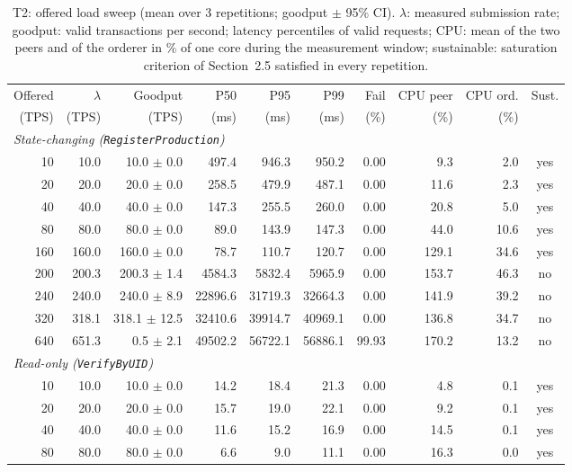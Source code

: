 \begin{table}[H]
\centering\small
\caption{T2: offered load sweep (mean over 3 repetitions; goodput $\pm$ 95\% CI). $\lambda$: measured
submission rate; goodput: valid transactions per second; latency percentiles of valid requests; CPU: mean of the two
peers and of the orderer in \% of one core during the measurement window; sustainable: saturation criterion of
Section~2.5 satisfied in every repetition.}
\label{tab:t2}
\setlength{\tabcolsep}{3.5pt}
\begin{tabular}{rrrrrrrrrc}
\toprule
Offered & $\lambda$ & Goodput & P50 & P95 & P99 & Fail & CPU peer & CPU ord. & Sust. \\
(TPS) & (TPS) & (TPS) & (ms) & (ms) & (ms) & (\%) & (\%) & (\%) & \\
\midrule
\multicolumn{10}{l}{\emph{State-changing (\texttt{RegisterProduction})}} \\
10 & 10.0 & 10.0 $\pm$ 0.0 & 497.4 & 946.3 & 950.2 & 0.00 & 9.3 & 2.0 & yes \\
20 & 20.0 & 20.0 $\pm$ 0.0 & 258.5 & 479.9 & 487.1 & 0.00 & 11.6 & 2.3 & yes \\
40 & 40.0 & 40.0 $\pm$ 0.0 & 147.3 & 255.5 & 260.0 & 0.00 & 20.8 & 5.0 & yes \\
80 & 80.0 & 80.0 $\pm$ 0.0 & 89.0 & 143.9 & 147.3 & 0.00 & 44.0 & 10.6 & yes \\
160 & 160.0 & 160.0 $\pm$ 0.0 & 78.7 & 110.7 & 120.7 & 0.00 & 129.1 & 34.6 & yes \\
200 & 200.3 & 200.3 $\pm$ 1.4 & 4584.3 & 5832.4 & 5965.9 & 0.00 & 153.7 & 46.3 & no \\
240 & 240.0 & 240.0 $\pm$ 8.9 & 22896.6 & 31719.3 & 32664.3 & 0.00 & 141.9 & 39.2 & no \\
320 & 318.1 & 318.1 $\pm$ 12.5 & 32410.6 & 39914.7 & 40969.1 & 0.00 & 136.8 & 34.7 & no \\
640 & 651.3 & 0.5 $\pm$ 2.1 & 49502.2 & 56722.1 & 56886.1 & 99.93 & 170.2 & 13.2 & no \\
\multicolumn{10}{l}{\emph{Read-only (\texttt{VerifyByUID})}} \\
10 & 10.0 & 10.0 $\pm$ 0.0 & 14.2 & 18.4 & 21.3 & 0.00 & 4.8 & 0.1 & yes \\
20 & 20.0 & 20.0 $\pm$ 0.0 & 15.7 & 19.0 & 22.1 & 0.00 & 9.2 & 0.1 & yes \\
40 & 40.0 & 40.0 $\pm$ 0.0 & 11.6 & 15.2 & 16.9 & 0.00 & 14.5 & 0.1 & yes \\
80 & 80.0 & 80.0 $\pm$ 0.0 & 6.6 & 9.0 & 11.1 & 0.00 & 16.3 & 0.0 & yes \\

\end{tabular}
\end{table}
